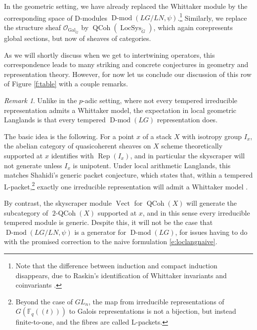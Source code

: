 \documentclass[10pt]{amsart}
\newcommand{\TwoCoh}{\on{2-QCoh}}
\newcommand{\LS}{\on{LocSys}_{\cG}}
\newcommand{\Fqt}{\Fq(\!(t)\!)}
\newcommand{\on}{\operatorname}
\newcommand{\Dmod}{\on{D-mod}}
\newcommand{\Fq}{\mathbb{F}_q}
\newcommand{\Vect}{\on{Vect}}
\theoremstyle{remark}
\newtheorem{re}[subsubsection]{Remark}
\newcommand{\OO}{\mathscr{O}}
\numberwithin{equation}{section}
\newcommand{\cG}{\check{G}}
\newcommand{\QCoh}{\on{QCoh}}
\begin{document}
	In the geometric setting, we have already replaced the Whittaker module by 
	the 
	corresponding space of D-modules $\Dmod(LG/LN, \psi)$.\footnote{Note that 
	the difference between 
	induction and 
	compact induction disappears, due to Raskin's identification of Whittaker 
	invariants and coinvariants \cite{whit}.} Similarly, we replace the structure sheaf 
	$\OO_{\on{Gal}_{\cG}}$ by $\QCoh(\LS)$, which again corepresents global 
	sections, but now of sheaves of categories. 
	
	
    As we will shortly discuss when we get to intertwining operators, this 
    correspondence leads to many striking and concrete conjectures in geometry and representation theory. However, for now let us 
    conclude our 
    discussion of this row of Figure \ref{f:table} with a couple remarks. 
    
    \begin{re} Unlike in the $p$-adic setting, where not every tempered irreducible representation 
    admits a Whittaker model, the expectation in local geometric Langlands is 
    that every tempered $\Dmod(LG)$ representation does. 
    
    
    The basic idea is the following. For a point $x$ of a stack $X$ with 
    isotropy group $I_x$, the abelian category of quasicoherent sheaves on $X$ 
    scheme theoretically supported at $x$ identifies with $\on{Rep}(I_x)$, and 
    in particular the 
    skyscraper will not generate unless $I_x$ is unipotent. Under local 
    arithmetic Langlands, this matches Shahidi's generic packet conjecture, which states that, within a tempered L-packet,\footnote{Beyond the case of $GL_n$, the map from 
    irreducible representations of $G(\Fqt)$ to Galois representations is not a 
    bijection, but instead finite-to-one, and the fibres are called L-packets.} exactly one irreducible representation will admit a 
    Whittaker model \cite{shahidi90}. 
    
     By contrast, the skyscraper module $\Vect$ for $\QCoh(X)$ will generate 
     the subcategory of $\TwoCoh(X)$ supported at $x$, and in this sense every 
     irreducible tempered module is generic. Despite this, it 
     will not be the case that $\Dmod(LG/LN, \psi)$ is a generator for 
     $\Dmod(LG)$, for issues having to do with the promised 
     correction to the naive formulation \eqref{e:loclangnaive}. 
    \end{re}
	
\end{document}
